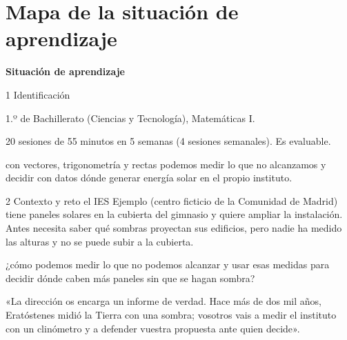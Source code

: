 \section{Mapa de la situación de aprendizaje}

{\fontsize{22}{26}\selectfont\bfseries\color{titular}Situación de aprendizaje\par}
\vspace{6pt}

\begin{filatarjetas}
  \begin{tarjeta}{1 Identificación}
     \tituloSA

     1.º de Bachillerato (Ciencias y Tecnología), Matemáticas I.

     20 sesiones de 55 minutos en 5 semanas (4 sesiones semanales). Es evaluable.

     \autor

     con vectores, trigonometría y rectas podemos medir lo que no alcanzamos y decidir con datos dónde generar energía solar en el propio instituto.
  \end{tarjeta}
  \begin{tarjeta}{2 Contexto y reto}
     el IES Ejemplo (centro ficticio de la Comunidad de Madrid) tiene paneles solares en la cubierta del gimnasio y quiere ampliar la instalación. Antes necesita saber qué sombras proyectan sus edificios, pero nadie ha medido las alturas y no se puede subir a la cubierta.

     ¿cómo podemos medir lo que no podemos alcanzar y usar esas medidas para decidir dónde caben más paneles sin que se hagan sombra?

     «La dirección os encarga un informe de verdad. Hace más de dos mil años, Eratóstenes midió la Tierra con una sombra; vosotros vais a medir el instituto con un clinómetro y a defender vuestra propuesta ante quien decide».
  \end{tarjeta}
\end{filatarjetas}


